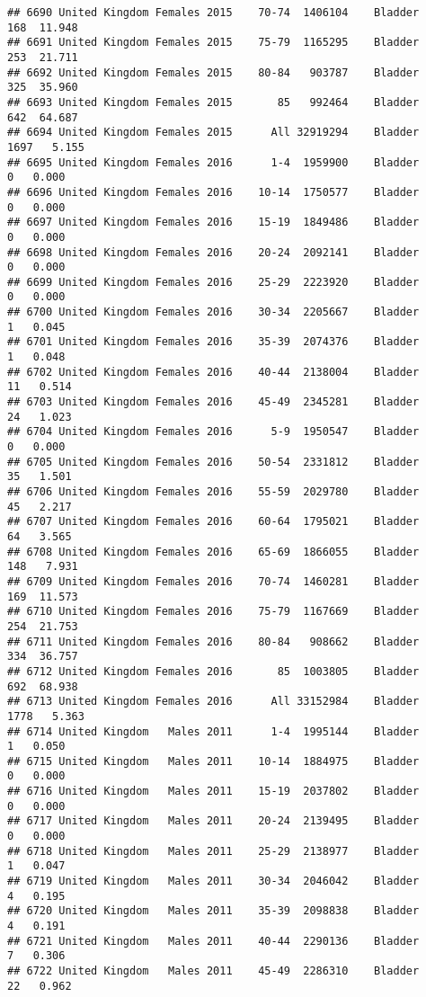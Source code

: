 \documentclass[
]{article}
\begin{document}
\begin{verbatim}
## 6690 United Kingdom Females 2015    70-74  1406104    Bladder    168  11.948
## 6691 United Kingdom Females 2015    75-79  1165295    Bladder    253  21.711
## 6692 United Kingdom Females 2015    80-84   903787    Bladder    325  35.960
## 6693 United Kingdom Females 2015       85   992464    Bladder    642  64.687
## 6694 United Kingdom Females 2015      All 32919294    Bladder   1697   5.155
## 6695 United Kingdom Females 2016      1-4  1959900    Bladder      0   0.000
## 6696 United Kingdom Females 2016    10-14  1750577    Bladder      0   0.000
## 6697 United Kingdom Females 2016    15-19  1849486    Bladder      0   0.000
## 6698 United Kingdom Females 2016    20-24  2092141    Bladder      0   0.000
## 6699 United Kingdom Females 2016    25-29  2223920    Bladder      0   0.000
## 6700 United Kingdom Females 2016    30-34  2205667    Bladder      1   0.045
## 6701 United Kingdom Females 2016    35-39  2074376    Bladder      1   0.048
## 6702 United Kingdom Females 2016    40-44  2138004    Bladder     11   0.514
## 6703 United Kingdom Females 2016    45-49  2345281    Bladder     24   1.023
## 6704 United Kingdom Females 2016      5-9  1950547    Bladder      0   0.000
## 6705 United Kingdom Females 2016    50-54  2331812    Bladder     35   1.501
## 6706 United Kingdom Females 2016    55-59  2029780    Bladder     45   2.217
## 6707 United Kingdom Females 2016    60-64  1795021    Bladder     64   3.565
## 6708 United Kingdom Females 2016    65-69  1866055    Bladder    148   7.931
## 6709 United Kingdom Females 2016    70-74  1460281    Bladder    169  11.573
## 6710 United Kingdom Females 2016    75-79  1167669    Bladder    254  21.753
## 6711 United Kingdom Females 2016    80-84   908662    Bladder    334  36.757
## 6712 United Kingdom Females 2016       85  1003805    Bladder    692  68.938
## 6713 United Kingdom Females 2016      All 33152984    Bladder   1778   5.363
## 6714 United Kingdom   Males 2011      1-4  1995144    Bladder      1   0.050
## 6715 United Kingdom   Males 2011    10-14  1884975    Bladder      0   0.000
## 6716 United Kingdom   Males 2011    15-19  2037802    Bladder      0   0.000
## 6717 United Kingdom   Males 2011    20-24  2139495    Bladder      0   0.000
## 6718 United Kingdom   Males 2011    25-29  2138977    Bladder      1   0.047
## 6719 United Kingdom   Males 2011    30-34  2046042    Bladder      4   0.195
## 6720 United Kingdom   Males 2011    35-39  2098838    Bladder      4   0.191
## 6721 United Kingdom   Males 2011    40-44  2290136    Bladder      7   0.306
## 6722 United Kingdom   Males 2011    45-49  2286310    Bladder     22   0.962

\end{verbatim}
\end{document}
